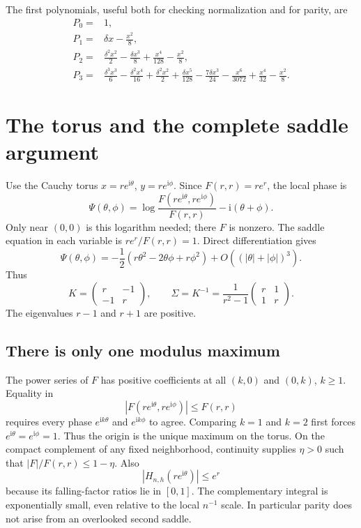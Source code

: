 \documentclass[11pt,letterpaper]{article}
\theoremstyle{remark}\newtheorem{remark}[theorem]{Remark}
\newcommand{\ii}{\mathrm i}
\begin{document}
The first polynomials, useful both for checking normalization and for parity, are
\begin{align}
 P_0={}&1,\nonumber\\
 P_1={}&\delta x-\frac{x^2}{8},\nonumber\\
 P_2={}&\frac{\delta^2x^2}{2}-\frac{\delta x^3}{8}
               +\frac{x^4}{128}-\frac{x^2}{8},\label{bsh:eq:Pfirst}\\
 P_3={}&\frac{\delta^3x^3}{6}-\frac{\delta^2x^4}{16}
       +\frac{\delta^2x^2}{2}+\frac{\delta x^5}{128}
       -\frac{7\delta x^3}{24}-\frac{x^6}{3072}
       +\frac{x^4}{32}-\frac{x^2}{8}.\nonumber
\end{align}

\section{The torus and the complete saddle argument}\label{bsh:sec:saddle}
Use the Cauchy torus $x=re^{\ii\theta}$, $y=re^{\ii\phi}$. Since $F(r,r)=re^r$, the local phase is
\begin{equation}\label{bsh:eq:phase}
 \Psi(\theta,\phi)=\log\frac{F(re^{\ii\theta},re^{\ii\phi})}{F(r,r)}
                    -\ii(\theta+\phi).
\end{equation}
Only near $(0,0)$ is this logarithm needed; there $F$ is nonzero. The saddle equation in each variable is $re^r/F(r,r)=1$. Direct differentiation gives
\begin{equation}\label{bsh:eq:hessian}
 \Psi(\theta,\phi)=-\frac12(r\theta^2-2\theta\phi+r\phi^2)
                 +O((|\theta|+|\phi|)^3).
\end{equation}
Thus
\begin{equation}\label{bsh:eq:Ksigma}
 K=\begin{pmatrix}r&-1\\-1&r\end{pmatrix},\qquad
 \Sigma=K^{-1}=\frac1{r^2-1}\begin{pmatrix}r&1\\1&r\end{pmatrix}.
\end{equation}
The eigenvalues $r-1$ and $r+1$ are positive.

\subsection{There is only one modulus maximum}
The power series of $F$ has positive coefficients at all $(k,0)$ and $(0,k)$, $k\geq1$. Equality in
\[
 |F(re^{\ii\theta},re^{\ii\phi})|\leq F(r,r)
\]
requires every phase $e^{\ii k\theta}$ and $e^{\ii k\phi}$ to agree. Comparing $k=1$ and $k=2$ first forces $e^{\ii\theta}=e^{\ii\phi}=1$. Thus the origin is the unique maximum on the torus. On the compact complement of any fixed neighborhood, continuity supplies $\eta>0$ such that $|F|/F(r,r)\leq1-\eta$. Also
\[
 |H_{n,h}(re^{\ii\theta})|\leq e^r
\]
because its falling-factor ratios lie in $[0,1]$. The complementary integral is exponentially small, even relative to the local $n^{-1}$ scale. In particular parity does not arise from an overlooked second saddle.
\end{document}
